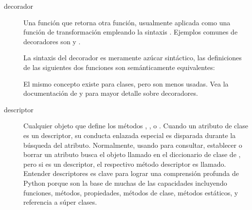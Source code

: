 \documentclass[a4,10pt,spanish]{sphinxmanual}
\begin{document}
\begin{description}
\item[{decorador\label{\detokenize{glossary:term-decorator}}}] \leavevmode
\sphinxAtStartPar
Una función que retorna otra función, usualmente aplicada como una función de transformación empleando la sintaxis . Ejemplos comunes de decoradores son   y .

\sphinxAtStartPar
La sintaxis del decorador es meramente azúcar sintáctico, las definiciones de las siguientes dos funciones son semánticamente equivalentes:

\begin{sphinxVerbatim}[commandchars=\\\{\}]
 
  

 
\end{sphinxVerbatim}

\sphinxAtStartPar
El mismo concepto existe para clases, pero son menos usadas. Vea la documentación de  y  para mayor detalle sobre decoradores.

\item[{descriptor\label{\detokenize{glossary:term-descriptor}}}] \leavevmode
\sphinxAtStartPar
Cualquier objeto que define los métodos , , o .   Cuando un atributo de clase es un descriptor, su conducta enlazada especial es disparada durante la búsqueda del atributo. Normalmente, usando  para consultar, establecer o borrar un atributo busca el objeto llamado  en el diccionario de clase de , pero si  es un descriptor, el respectivo método descriptor es llamado.  Entender descriptores es clave para lograr una comprensión profunda de Python porque son la base de muchas de las capacidades incluyendo funciones, métodos, propiedades, métodos de clase, métodos estáticos, y referencia a súper clases.


\end{description}
\end{document}
